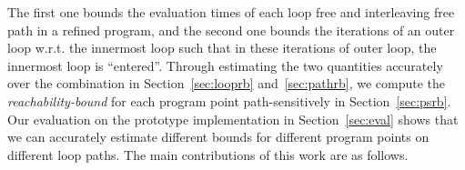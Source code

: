 The first one bounds the evaluation times of each loop free and interleaving free path in a refined program, and the second one bounds the iterations of an outer loop w.r.t. the innermost loop such that in these iterations of outer loop, the innermost loop is ``entered''. 
Through estimating the two quantities accurately over the combination in Section~\ref{sec:looprb} and~\ref{sec:pathrb}, we compute the \emph{reachability-bound} for each program point path-sensitively in Section~\ref{sec:psrb}.
Our evaluation on the prototype implementation in Section~\ref{sec:eval} shows that we can accurately estimate different bounds for different program points on different loop paths. The main contributions of this work are as follows.
